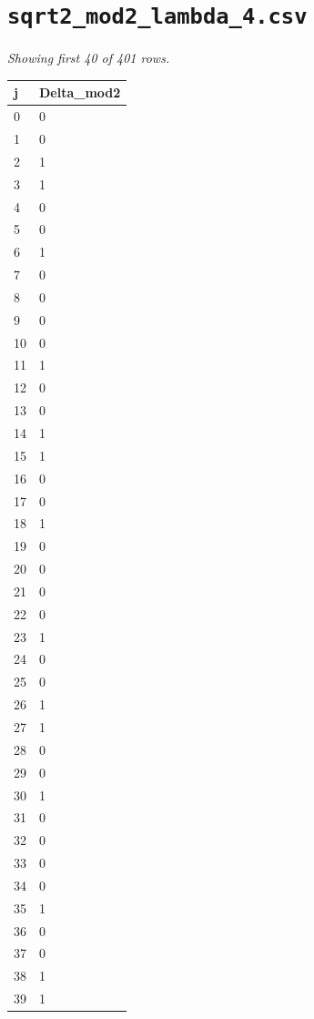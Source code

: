 \documentclass[10pt]{article}
\begin{document}
\section*{\texttt{sqrt2\_mod2\_lambda\_4.csv}}
\noindent\textit{Showing first 40 of 401 rows.}\par\medskip
{\footnotesize
\begin{longtable}{@{}ll@{}}
\toprule
\textbf{j} & \textbf{Delta\_mod2} \\
\midrule\endhead
0 & 0 \\
1 & 0 \\
2 & 1 \\
3 & 1 \\
4 & 0 \\
5 & 0 \\
6 & 1 \\
7 & 0 \\
8 & 0 \\
9 & 0 \\
10 & 0 \\
11 & 1 \\
12 & 0 \\
13 & 0 \\
14 & 1 \\
15 & 1 \\
16 & 0 \\
17 & 0 \\
18 & 1 \\
19 & 0 \\
20 & 0 \\
21 & 0 \\
22 & 0 \\
23 & 1 \\
24 & 0 \\
25 & 0 \\
26 & 1 \\
27 & 1 \\
28 & 0 \\
29 & 0 \\
30 & 1 \\
31 & 0 \\
32 & 0 \\
33 & 0 \\
34 & 0 \\
35 & 1 \\
36 & 0 \\
37 & 0 \\
38 & 1 \\
39 & 1 \\
\bottomrule
\end{longtable}}
\end{document}
